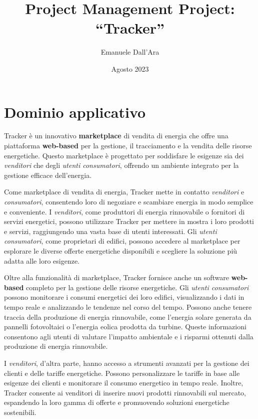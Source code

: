 \documentclass[oneside]{book}
\title{\LARGE Project Management Project: \\“Tracker”}
\author{
   Emanuele Dall'Ara\\ \emailaddr{emanuele.dallara@studio.unibo.it} 
}
\date{Agosto 2023}
\begin{document}
\maketitle
\tableofcontents
\clearpage
\chapter{Dominio applicativo}

Tracker è un innovativo \textbf{marketplace} di vendita di energia che offre una piattaforma \textbf{web-based} per la gestione, il tracciamento e la vendita delle risorse energetiche. Questo marketplace è progettato per soddisfare le esigenze sia dei \textit{venditori} che degli \textit{utenti consumatori}, offrendo un ambiente integrato per la gestione efficace dell'energia.

Come marketplace di vendita di energia, Tracker mette in contatto \textit{venditori} e \textit{consumatori}, consentendo loro di negoziare e scambiare energia in modo semplice e conveniente. I \textit{venditori}, come produttori di energia rinnovabile o fornitori di servizi energetici, possono utilizzare Tracker per mettere in mostra i loro prodotti e servizi, raggiungendo una vasta base di utenti interessati. Gli \textit{utenti consumatori}, come proprietari di edifici, possono accedere al marketplace per esplorare le diverse offerte energetiche disponibili e scegliere la soluzione più adatta alle loro esigenze.

Oltre alla funzionalità di marketplace, Tracker fornisce anche un software \textbf{web-based} completo per la gestione delle risorse energetiche. Gli \textit{utenti consumatori} possono monitorare i consumi energetici dei loro edifici, visualizzando i dati in tempo reale e analizzando le tendenze nel corso del tempo. Possono anche tenere traccia della produzione di energia rinnovabile, come l'energia solare generata da pannelli fotovoltaici o l'energia eolica prodotta da turbine. Queste informazioni consentono agli utenti di valutare l'impatto ambientale e i risparmi ottenuti dalla produzione di energia rinnovabile.

I \textit{venditori}, d'altra parte, hanno accesso a strumenti avanzati per la gestione dei clienti e delle tariffe energetiche. Possono personalizzare le tariffe in base alle esigenze dei clienti e monitorare il consumo energetico in tempo reale. Inoltre, Tracker consente ai venditori di inserire nuovi prodotti rinnovabili sul mercato, espandendo la loro gamma di offerte e promuovendo soluzioni energetiche sostenibili.
\end{document}

